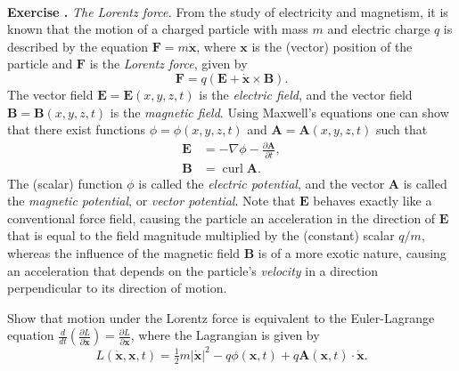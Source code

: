 \documentclass[12pt]{amsart}
\newcommand{\eqst}[1]{\begin{align*}#1\end{align*}}
\newcommand{\curl}{\operatorname{curl}}
\newcommand{\grad}{\nabla}
\newcommand{\der}[2]{\frac{d#1}{d#2}}
\newcommand{\pder}[2]{\frac{\partial#1}{\partial#2}}
\newcounter{example}
\newcounter{exercise}
\newcommand{\beginexample}[1]{\ \\ \addtocounter{example}{1} \textbf{Example \arabic{example}.} \textit{#1.}}
\newcommand{\beginexercise}[1]{\ \\ \addtocounter{exercise}{1} \textbf{Exercise \arabic{exercise}.} \textit{#1.}}
\begin{document}
%
%

\beginexercise{The Lorentz force} From the study of electricity and magnetism, it is known that the motion of a charged particle with mass $m$ and electric charge $q$ is described by the equation $\mathbf{F}=m \ddot{\mathbf{x}}$, where $\mathbf{x}$ is the (vector) position of the particle and $\mathbf{F}$ is the \emph{Lorentz force}, given by
$$ \mathbf{F} = q\left(\mathbf{E} + \dot{\mathbf{x}}\times \mathbf{B}\right). $$
The vector field $\mathbf{E}=\mathbf{E}(x,y,z,t)$ is the \emph{electric field}, and the vector field $\mathbf{B}=\mathbf{B}(x,y,z,t)$ is the \emph{magnetic field}. Using Maxwell's equations one can show that there exist functions $\phi=\phi(x,y,z,t)$ and $\mathbf{A}=\mathbf{A}(x,y,z,t)$ such that
\eqst{
\mathbf{E} &= - \grad \phi - \pder{\mathbf{A}}{t}, \\
\mathbf{B} &= \curl \mathbf{A}.
}
The (scalar) function $\phi$ is called the \emph{electric potential}, and the vector $\mathbf{A}$ is called the \emph{magnetic potential}, or \emph{vector potential}. Note that $\mathbf{E}$ behaves exactly like a conventional force field, causing the particle an acceleration in the direction of $\mathbf{E}$ that is equal to the field magnitude multiplied by the (constant) scalar $q/m$, whereas the influence of the magnetic field $\mathbf{B}$ is of a more exotic nature, causing an acceleration that depends on the particle's \emph{velocity} in a direction perpendicular to its direction of motion.

\smallskip \noindent Show that motion under the Lorentz force is equivalent to the Euler-Lagrange equation $ \der{}{t}\left(\pder{L}{\dot{\mathbf{x}}}\right)=\pder{L}{\mathbf{x}}$, where the Lagrangian is given by
$$ L(\dot{\mathbf{x}},\mathbf{x},t) = \tfrac12 m |\dot{\mathbf{x}}|^2 - q \phi(\mathbf{x},t) +q \mathbf{A}(\mathbf{x},t)\cdot \dot{\mathbf{x}}. $$
\end{document}
